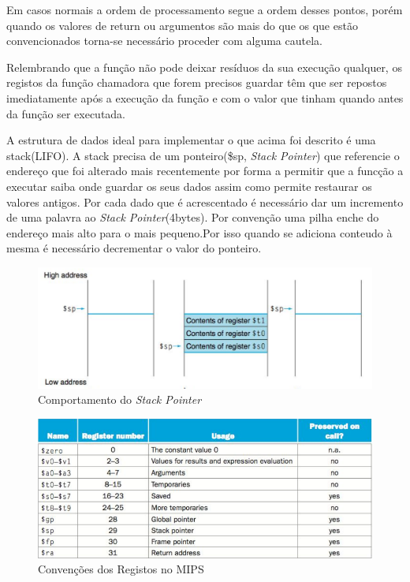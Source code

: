 \documentclass[10pt,a4paper]{book}
\begin{document}
 		Em casos normais a ordem de processamento segue a ordem desses pontos, porém quando os
 		valores de return ou argumentos são mais do que os que estão convencionados torna-se
 		necessário proceder com alguma cautela.

 		Relembrando que a função não pode deixar resíduos da sua execução qualquer, os registos
 		da função chamadora que forem precisos guardar têm que ser repostos imediatamente após a
 		 execução da função e com o valor que tinham quando antes da função ser executada.

 		A estrutura de dados ideal para implementar o que acima foi descrito é uma stack(LIFO).
 		A stack precisa de um ponteiro(\$sp, \textit{Stack Pointer}) que referencie o endereço que foi alterado mais recentemente por forma a permitir que a funcção a executar saiba onde guardar os seus dados assim como permite restaurar os valores antigos.
 		Por cada dado que é acrescentado é necessário dar um incremento de uma palavra ao \textit{Stack Pointer}(4bytes).
 		Por convenção uma pilha enche do endereço mais alto para o mais pequeno.Por isso quando se adiciona conteudo à mesma é necessário decrementar o valor do ponteiro.


 		\begin{figure}[htp]
	    	\centering
	    	\includegraphics[scale=0.6]{stack1.png}
	    	\caption{Comportamento do \textit{Stack Pointer}}
	    	\label{stack 1}
		\end{figure}


 		\begin{figure}[htp]
	    	\centering
	    	\includegraphics[scale=0.6]{registerconvention.png}
	    	\caption{Convenções dos Registos no MIPS}
	    	\label{conventions}
		\end{figure}
\end{document}
